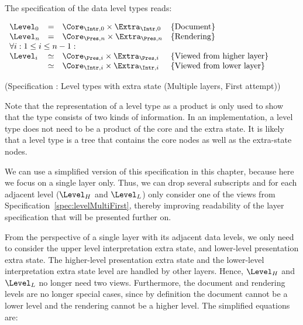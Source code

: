 The specification of the data level types reads:

\begin{small}
 \label{spec:levelMultiFirst}
\(\begin{array}{lcll}
\Level_{0} & = & \Core_{\Intr,0} \times \Extra_{\Intr,0}      & \text{\{Document\}}\\
\Level_{n} & = & \Core_{\Pres,n} \times \Extra_{\Pres,n}      & \text{\{Rendering\}}\\
\lefteqn{\forall i:1 \le i \le n-1:}  \\
\Level_{i}  & \simeq & \Core_{\Pres,i} \times \Extra_{\Pres,i}     & \text{\{Viewed from higher layer\}}\\
                & \simeq & \Core_{\Intr,i} \times \Extra_{\Intr,i} &  \text{\{Viewed from lower layer\}}\\
\end{array}\)\end{small}
\begin{center}(Specification \thespecification: Level types with extra state (Multiple layers, First attempt))\end{center}\vspace{1em}



Note that the representation of a level type as a product is only used to show that the type consists of two kinds of information. In an implementation, a level type does not need to be a product of the core and the extra state. It is likely that a level type is a tree that contains the core nodes as well as the extra-state nodes.

We can use a simplified version of this specification in this chapter, because here we focus on a single layer only. Thus, we can drop several subscripts and for each adjacent level ($\Level_{H}$ and $\Level_{L}$) only consider one of the views from Specification~\ref{spec:levelMultiFirst}, thereby improving readability of the layer specification that will be presented further on. 

From the perspective of a single layer with its adjacent data levels, we only need to consider the upper level interpretation extra state, and lower-level presentation extra state. The higher-level presentation extra state and the lower-level interpretation extra state level are handled by other layers. Hence, $\Level_{H}$ and $\Level_{L}$ no longer need two views. Furthermore, the document and rendering levels are no longer special cases, since by definition the document cannot be a lower level and the rendering cannot be a higher level. The simplified equations are:

